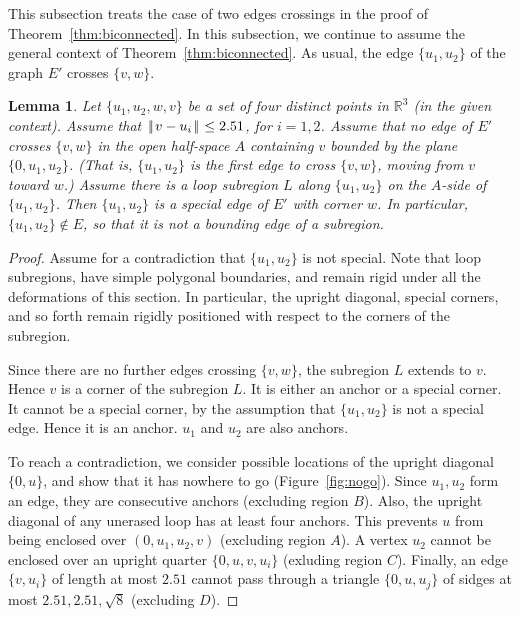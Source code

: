 \documentclass[11pt]{amsart}
\newcommand{\ring}[1]{\mathbb{#1}}
\def\|{{\hskip0.1em|\hskip-0.15em|\hskip0.1em}}
\newtheorem{lemma}{Lemma}
\begin{document}
This subsection treats the case of two edges crossings in the proof
of Theorem~\ref{thm:biconnected}.
In this subsection, we continue to assume the general context of Theorem~\ref{thm:biconnected}.  As usual, 
the edge $\{u_1,u_2\}$ of the graph $E'$ crosses $\{v,w\}$.

\begin{lemma}\label{lemma:special}
Let $\{u_1,u_2,w,v\}$ be a set of four distinct points
in $\ring{R}^3$ (in the given context).  
Assume that
 $\|v-u_i\|\le 2.51$, for $i=1,2$.
Assume that no edge of $E'$ crosses $\{v,w\}$
in the open 
half-space $A$ containing $v$ bounded by the plane $\{0,u_1,u_2\}$.
(That is, $\{u_1,u_2\}$ is the first edge to cross $\{v,w\}$, moving
from $v$ toward $w$.)
Assume there is a loop subregion $L$ along 
$\{u_1,u_2\}$ on the $A$-side
of $\{u_1,u_2\}$.  Then $\{u_1,u_2\}$ is a special edge of $E'$ with
corner $w$.
In particular, $\{u_1,u_2\}\not\in E$, so that it is not a bounding
edge of a subregion.
\end{lemma}

\begin{proof}
Assume for a contradiction that $\{u_1,u_2\}$ is not special.
Note that loop subregions, have simple polygonal boundaries, and
remain rigid under all the deformations of this section.  In particular,
the upright diagonal, special corners, and so forth
remain rigidly positioned with respect to the corners of the subregion.

Since there are no further edges crossing $\{v,w\}$, the subregion
$L$ extends to $v$.  Hence $v$ is a corner of the subregion $L$.
It is either an anchor or a special corner. It cannot be a special
corner, by the assumption that $\{u_1,u_2\}$ is not a special edge.
Hence it is an anchor.  $u_1$ and $u_2$ are also anchors.

To reach a contradiction, 
we consider possible locations of the upright diagonal $\{0,u\}$,
and show that it has nowhere to go (Figure~\ref{fig:nogo}).  
Since $u_1,u_2$ form an edge,
they are consecutive anchors (excluding region $B$).  
Also, the upright diagonal of any
unerased loop has at least four anchors.  This prevents $u$ from
being enclosed over $(0,u_1,u_2,v)$ (excluding region $A$).
A vertex $u_2$ cannot be enclosed over an upright quarter $\{0,u,v,u_i\}$
(exluding region $C$).  Finally, an edge $\{v,u_i\}$
of length at most $2.51$ cannot pass through a triangle $\{0,u,u_j\}$
of sidges at most $2.51,2.51,\sqrt8$ (excluding $D$).
\end{proof}
\end{document}
